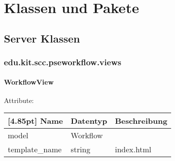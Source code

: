 \chapter{Klassen und Pakete}

%            


%

    \section{Server Klassen}

    \subsection{edu.kit.scc.pseworkflow.views}

		\subsubsection{WorkflowView}

        Attribute:
        \begin{center}
        	\renewcommand{\arraystretch}{1.5}
            \setlength\tabcolsep{5pt}
        	\begin{tabularx}{\textwidth}{|l|l|X|}
        		\hline
                \rowcolor[gray]{0.75}[4.85pt]            		
        	    Name & Datentyp & Beschreibung \\ \hline
        	    model & Workflow &  \\ \hline
        		template\_name & string & index.html \\ \hline				
        	\end{tabularx}
        \end{center}

